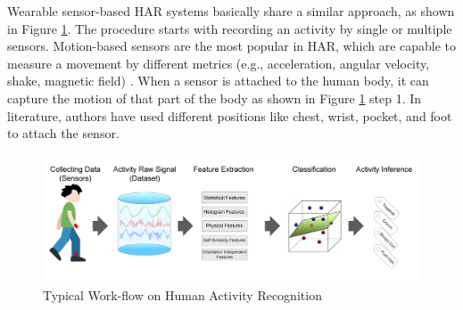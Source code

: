 \documentclass[journal,article,submit,moreauthors,pdftex]{Definitions/mdpi}
\begin{document}
Wearable sensor-based HAR systems basically share a similar approach, as shown in Figure \ref{fig:main_approach}. The procedure starts with recording an activity by single or multiple sensors\cite{s140610146}. Motion-based sensors are the most popular in HAR, which are capable to measure a movement by different metrics (e.g., acceleration, angular velocity, shake, magnetic field) \cite{hassan2018robust}. When a sensor is attached to the human body, it can capture the motion of that part of the body as shown in Figure \ref{fig:main_approach} step 1. In literature\cite{morris2014recofit, s140610146, wang2019survey}, authors have used different positions like chest, wrist, pocket, and foot to attach the sensor.

\begin{figure}[H]
	\centering
	\includegraphics[width=14 cm]{Definitions/images/main_approach.jpg}
	\caption{Typical Work-flow on Human Activity Recognition}
	\label{fig:main_approach}
\end{figure} 
 
\end{document}
